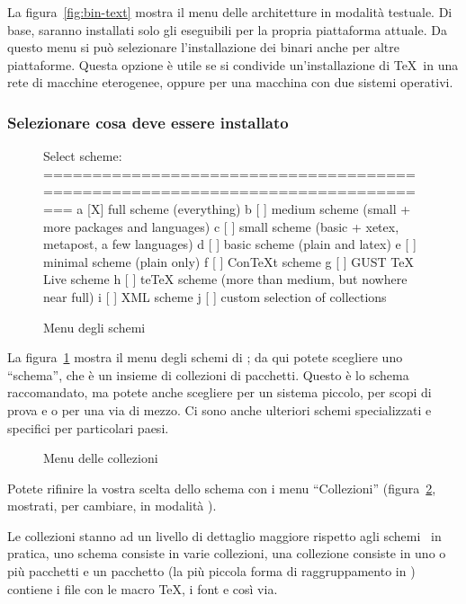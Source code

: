 \documentclass{article}
\begin{document}
La figura~\ref{fig:bin-text} mostra il menu delle architetture in modalità
testuale. Di base, saranno installati solo gli eseguibili per la propria
piattaforma attuale. Da questo menu si può selezionare l'installazione
dei binari anche per altre piattaforme. Questa opzione è utile se si
condivide un'installazione di \TeX\ in una rete di macchine eterogenee,
oppure per una macchina con due sistemi operativi.

\subsubsection{Selezionare cosa deve essere installato}
\label{sec:components}

\begin{figure}[tbh]
\begin{boxedverbatim}
Select scheme:
===============================================================================
 a [X] full scheme (everything)
 b [ ] medium scheme (small + more packages and languages)
 c [ ] small scheme (basic + xetex, metapost, a few languages)
 d [ ] basic scheme (plain and latex)
 e [ ] minimal scheme (plain only)
 f [ ] ConTeXt scheme
 g [ ] GUST TeX Live scheme
 h [ ] teTeX scheme (more than medium, but nowhere near full)
 i [ ] XML scheme
 j [ ] custom selection of collections
\end{boxedverbatim}
\caption{Menu degli schemi}\label{fig:scheme-text}
\end{figure}

La figura~\ref{fig:scheme-text} mostra il menu degli schemi di \TL; da qui
potete scegliere uno ``schema'', che è un insieme di collezioni di pacchetti.
Questo è lo schema raccomandato, ma potete anche scegliere 
per un sistema piccolo,  per scopi di prova e
 o  per una via di mezzo. Ci sono anche
ulteriori schemi specializzati e specifici per particolari paesi.

\begin{figure}[tbh]
\centering {}
\caption{Menu delle collezioni}\label{fig:collections-gui}
\end{figure}

Potete rifinire la vostra scelta dello schema con i menu ``Collezioni''
(figura~\ref{fig:collections-gui}, mostrati, per cambiare, in modalità \GUI).

Le collezioni stanno ad un livello di dettaglio maggiore rispetto agli
schemi \Dash\ in pratica, uno schema consiste in varie collezioni, una
collezione consiste in uno o più pacchetti e un pacchetto (la più piccola
forma di raggruppamento in \TL) contiene i file con le macro \TeX, i font
e così via.
\end{document}

